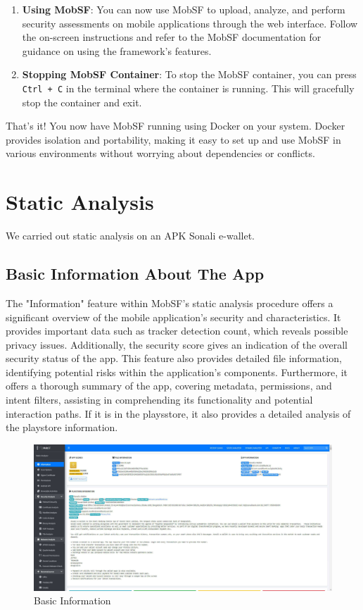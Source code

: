 \documentclass{report}
\begin{document}
\begin{enumerate}
    \item \textbf{Using MobSF}: You can now use MobSF to upload, analyze, and perform security assessments on mobile applications through the web interface. Follow the on-screen instructions and refer to the MobSF documentation for guidance on using the framework's features.
    
    \item \textbf{Stopping MobSF Container}: To stop the MobSF container, you can press \texttt{Ctrl + C} in the terminal where the container is running. This will gracefully stop the container and exit.

   
\end{enumerate}

That's it! You now have MobSF running using Docker on your system. Docker provides isolation and portability, making it easy to set up and use MobSF in various environments without worrying about dependencies or conflicts.

\chapter{Static Analysis}
We carried out static analysis on an APK Sonali e-wallet. 
\section{Basic Information About The App}
The "Information" feature within MobSF's static analysis procedure offers a significant overview of the mobile application's security and characteristics. It provides important data such as tracker detection count, which reveals possible privacy issues. Additionally, the security score gives an indication of the overall security status of the app. This feature also provides detailed file information, identifying potential risks within the application's components. Furthermore, it offers a thorough summary of the app, covering metadata, permissions, and intent filters, assisting in comprehending its functionality and potential interaction paths. If it is in the playsstore, it also provides a detailed analysis of the playstore information.

\begin{figure}[hbt!]
        \centering
        \includegraphics[width=1\textwidth]{images/information.jpg}
        \caption{Basic Information}
        \label{fig:example}
\end{figure}
\FloatBarrier 
\end{document}
